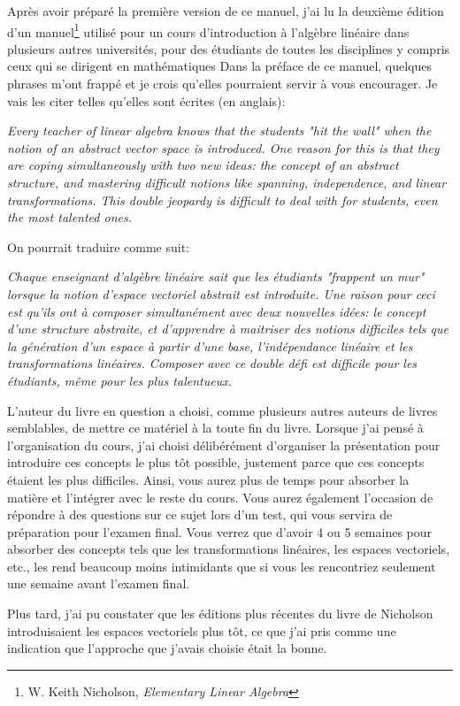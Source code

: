 \begin{TwoCol}
\begin{small}
Après avoir préparé la première version de ce manuel, 
j'ai lu la deuxième édition d'un manuel\footnote{W. Keith Nicholson,
\textit{Elementary Linear Algebra}} utilisé pour un cours d'introduction 
à l'algèbre linéaire dans plusieurs autres universités, pour des étudiants de toutes 
les disciplines y compris ceux qui se dirigent en mathématiques Dans la préface de
ce manuel, quelques phrases 
m'ont frappé et je crois qu'elles pourraient servir à vous encourager. 
Je vais les citer telles qu'elles sont écrites (en anglais):


\textit{
Every teacher of linear algebra knows that the students "hit the wall"
 when the notion of an abstract vector space is introduced.  
 One reason for this is that they are coping simultaneously with two new ideas: 
 the concept of an abstract structure, and mastering difficult notions like spanning, 
 independence, and linear transformations. 
  This double jeopardy is difficult to deal with for students, even the most talented ones. }



On pourrait traduire comme suit:  

\textit{
Chaque enseignant d'algèbre linéaire sait que les étudiants "frappent un mur" 
lorsque la notion d'espace vectoriel abstrait est introduite. 
 Une raison pour ceci est qu'ils ont à composer simultanément avec deux nouvelles idées: 
 le concept d'une structure abstraite, et d'apprendre à maitriser des notions difficiles 
 tels que la génération d'un espace à partir d'une base, l'indépendance linéaire et 
 les transformations linéaires.  
 Composer avec ce double défi est difficile pour les étudiants, même pour les plus talentueux.}

L'auteur du livre en question a choisi, comme plusieurs autres auteurs de livres semblables, 
de mettre ce matériel à la toute fin du livre. 
 Lorsque j'ai pensé à l'organisation du cours, j'ai choisi délibérément d'organiser 
 la présentation pour introduire ces concepts le plus tôt possible, justement parce que 
 ces concepts étaient les plus difficiles. 
  Ainsi, vous aurez plus de temps pour absorber la matière et l'intégrer avec le reste du cours. 
  Vous aurez également l'occasion de répondre à des questions sur ce sujet lors d'un test,  qui vous servira de préparation pour l'examen final.    
  Vous verrez que d'avoir 4 ou 5 semaines pour absorber des concepts tels que les transformations linéaires,
 les espaces vectoriels, etc., les rend beaucoup moins intimidants que si vous les rencontriez seulement une semaine avant l'examen final.

Plus tard, j'ai pu constater que les éditions plus récentes du livre de Nicholson introduisaient
les espaces vectoriels plus tôt, ce que j'ai pris comme une indication que l'approche que j'avais choisie 
était la bonne.

\end{small}
\end{TwoCol}